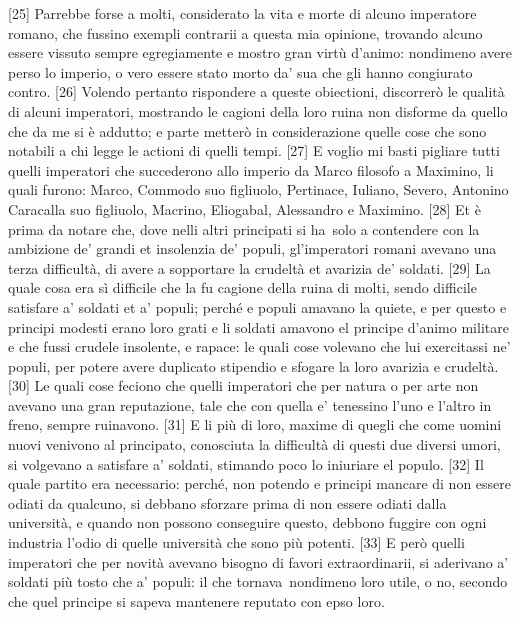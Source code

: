 {[}25{]} Parrebbe forse a molti, considerato la vita e morte di alcuno
imperatore romano, che fussino exempli contrarii a questa mia opinione,
trovando alcuno essere vissuto sempre egregiamente e mostro gran virtù
d'animo: nondimeno avere perso lo imperio, o vero essere stato morto da'
sua che gli hanno congiurato contro. {[}26{]} Volendo pertanto
rispondere a queste obiectioni, discorrerò le qualità di alcuni
imperatori, mostrando le cagioni della loro ruina non disforme da quello
che da me si è addutto; e parte metterò in considerazione quelle cose
che sono notabili a chi legge le actioni di quelli tempi. {[}27{]} E
voglio mi basti pigliare tutti quelli imperatori che succederono allo
imperio da Marco filosofo a Maximino, li quali furono: Marco, Commodo
suo figliuolo, Pertinace, Iuliano, Severo, Antonino Caracalla suo
figliuolo, Macrino, Eliogabal, Alessandro e Maximino. {[}28{]} Et è
prima da notare che, dove nelli altri principati si ha\est\ solo a contendere
con la ambizione de' grandi et insolenzia de' populi, gl'imperatori
romani avevano una terza difficultà, di avere a sopportare la crudeltà
et avarizia de' soldati. {[}29{]} La quale cosa era sì difficile che la
fu cagione della ruina di molti, sendo difficile satisfare a' soldati et
a' populi; perché e populi amavano la quiete, e per questo e principi
modesti erano loro grati e li soldati amavono el principe d'animo
militare e che fussi crudele insolente, e rapace: le quali cose volevano
che lui exercitassi ne' populi, per potere avere duplicato stipendio e
sfogare la loro avarizia e crudeltà. {[}30{]} Le quali cose feciono che
quelli imperatori che per natura o per arte non avevano una gran
reputazione, tale che con quella e' tenessino l'uno e l'altro in freno,
sempre ruinavono. {[}31{]} E li più di loro, maxime di quegli che come
uomini nuovi venivono al principato, conosciuta la difficultà di questi
due diversi umori, si volgevano a satisfare a' soldati, stimando poco lo
iniuriare el populo. {[}32{]} Il quale partito era necessario: perché,
non potendo e principi mancare di non essere odiati da qualcuno, si
debbano sforzare prima di non essere odiati dalla università, e quando
non possono conseguire questo, debbono fuggire con ogni industria l'odio
di quelle università che sono più potenti. {[}33{]} E però quelli
imperatori che per novità avevano bisogno di favori extraordinarii, si
aderivano a' soldati più tosto che a' populi: il che tornava\est\ nondimeno
loro utile, o no, secondo che quel principe si sapeva mantenere reputato
con epso loro.

